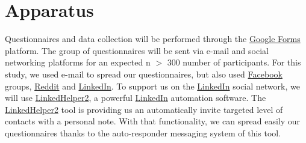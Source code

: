 
\section{Apparatus}
\label{sec:sec005}

Questionnaires and data collection will be performed through the \href{http://forms.google.com/}{Google Forms} platform.
The group of questionnaires will be sent via e-mail and social networking platforms for an expected n $>$ 300 number of participants.
For this study, we used e-mail to spread our questionnaires, but also used \href{https://www.facebook.com/}{Facebook} groups, \href{https://www.reddit.com/}{Reddit} and \href{https://www.linkedin.com/}{LinkedIn}.
To support us on the \href{https://www.linkedin.com/}{LinkedIn} social network, we will use \href{https://www.linkedhelper.com/}{LinkedHelper2}, a powerful \href{https://www.linkedin.com/}{LinkedIn} automation software.
The \href{https://www.linkedhelper.com/}{LinkedHelper2} tool is providing us an automatically invite targeted level of contacts with a personal note.
With that functionality, we can spread easily our questionnaires thanks to the auto-responder messaging system of this tool.

